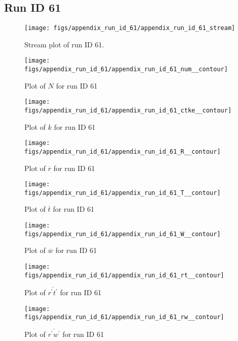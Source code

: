 \subsection{Run ID 61}
\begin{figure}[H]
\centering
\texttt{[image: figs/appendix\_run\_id\_61/appendix\_run\_id\_61\_stream]}
\caption{Stream plot of run ID 61.}
\label{fig:appendix_run_id_61_stream}
\end{figure}


\begin{figure}[H]
\centering
\texttt{[image: figs/appendix\_run\_id\_61/appendix\_run\_id\_61\_num\_\_contour]}
\caption{Plot of $N$ for run ID 61}
\label{fig:appendix_run_id_61_num__contour}
\end{figure}


\begin{figure}[H]
\centering
\texttt{[image: figs/appendix\_run\_id\_61/appendix\_run\_id\_61\_ctke\_\_contour]}
\caption{Plot of $k$ for run ID 61}
\label{fig:appendix_run_id_61_ctke__contour}
\end{figure}


\begin{figure}[H]
\centering
\texttt{[image: figs/appendix\_run\_id\_61/appendix\_run\_id\_61\_R\_\_contour]}
\caption{Plot of $\overline{r}$ for run ID 61}
\label{fig:appendix_run_id_61_R__contour}
\end{figure}


\begin{figure}[H]
\centering
\texttt{[image: figs/appendix\_run\_id\_61/appendix\_run\_id\_61\_T\_\_contour]}
\caption{Plot of $\overline{t}$ for run ID 61}
\label{fig:appendix_run_id_61_T__contour}
\end{figure}


\begin{figure}[H]
\centering
\texttt{[image: figs/appendix\_run\_id\_61/appendix\_run\_id\_61\_W\_\_contour]}
\caption{Plot of $\overline{w}$ for run ID 61}
\label{fig:appendix_run_id_61_W__contour}
\end{figure}


\begin{figure}[H]
\centering
\texttt{[image: figs/appendix\_run\_id\_61/appendix\_run\_id\_61\_rt\_\_contour]}
\caption{Plot of $\overline{r^\prime t^\prime}$ for run ID 61}
\label{fig:appendix_run_id_61_rt__contour}
\end{figure}


\begin{figure}[H]
\centering
\texttt{[image: figs/appendix\_run\_id\_61/appendix\_run\_id\_61\_rw\_\_contour]}
\caption{Plot of $\overline{r^\prime w^\prime}$ for run ID 61}
\label{fig:appendix_run_id_61_rw__contour}
\end{figure}



